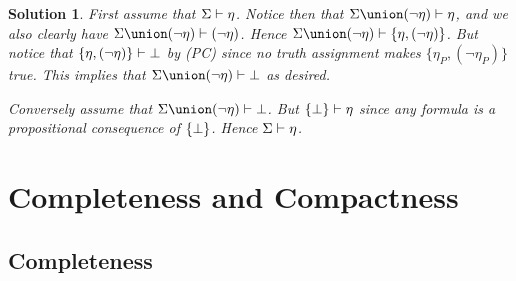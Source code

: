 \documentclass[article, a4paper, 11pt, oneside]{memoir}
\numberwithin{equation}{chapter}
\theoremstyle{nonumberplain}
\newtheorem{solution}{Solution}
\begin{document}
\begin{solution}
    First assume that $\Sigma \vdash \eta$. Notice then that $\Sigma \union (\neg \eta) \proves \eta$, and we also clearly have $\Sigma \union (\neg \eta) \proves (\neg \eta)$. Hence $\Sigma \union (\neg \eta) \proves \{ \eta, (\neg \eta) \}$. But notice that $\{ \eta, (\neg \eta) \} \vdash \bot$ by (PC) since no truth assignment makes $\{ \eta_P, (\neg \eta_P) \}$ true. This implies that $\Sigma \union (\neg \eta) \proves \false$ as desired.

    Conversely assume that $\Sigma \union (\neg \eta) \proves \false$. But $\{ \bot \} \vdash \eta$ since any formula is a propositional consequence of $\{ \bot \}$. Hence $\Sigma \vdash \eta$.
\end{solution}


\chapter{Completeness and Compactness}

\section*{Completeness}
\end{document}
